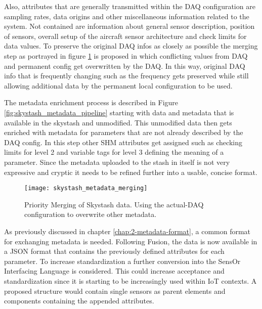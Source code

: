 Also, attributes that are generally transmitted within the DAQ configuration are sampling rates, data origins and other miscellaneous information related to the system. Not contained are information about general sensor description, position of sensors, overall setup of the aircraft sensor architecture and check limits for data values. To preserve the original DAQ infos as closely as possible the merging step as portrayed in figure \ref{fig:skystash_metadata_merging} is proposed in which conflicting values from DAQ and permanent config get overwritten by the DAQ. In this way, original DAQ info that is frequently changing such as the frequency gets preserved while still allowing additional data by the permanent local configuration to be used.

The metadata enrichment process is described in Figure \ref{fig:skystash_metadata_pipeline} starting with data and metadata that is available in the skystash and unmodified. This unmodified data then gets enriched with metadata for parameters that are not already described by the DAQ config. In this step other SHM attributes get assigned such as checking limits for level 2 and variable tags for level 3 defining the meaning of a parameter. Since the metadata uploaded to the stash in itself is not very expressive and cryptic it needs to be refined further into a usable, concise format.
\begin{figure}
    \centering
    \texttt{[image: skystash\_metadata\_merging]}
    \caption{Priority Merging of Skystash data. Using the actual-DAQ configuration to overwrite other metadata.}
    \label{fig:skystash_metadata_merging}
\end{figure}


As previously discussed in chapter \ref{chap:2-metadata-format}, a common format for exchanging metadata is needed. Following Fusion, the data is now available in a JSON format that contains the previously defined attributes for each parameter. To increase standardization a further conversion into the SensOr Interfacing Language is considered. This could increase acceptance and standardization since it is starting to be increasingly used within IoT contexts. A proposed structure would contain single sensors as parent elements and components containing the appended attributes. \cite{behrens_domain-specific_2021}

